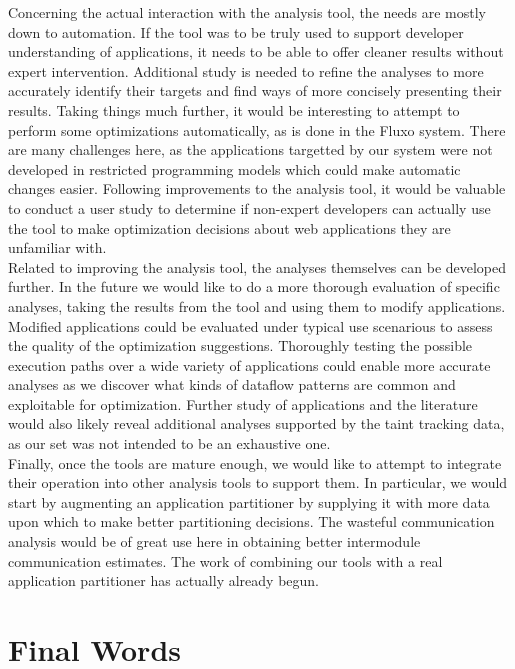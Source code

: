 \documentclass[msc,oneside]{ubcthesis}
\begin{document}
Concerning the actual interaction with the analysis tool, the needs are mostly down to automation. If the tool was to be truly used to support developer understanding of applications, it needs to be able to offer cleaner results without expert intervention. Additional study is needed to refine the analyses to more accurately identify their targets and find ways of more concisely presenting their results. Taking things much further, it would be interesting to attempt to perform some optimizations automatically, as is done in the Fluxo system. There are many challenges here, as the applications targetted by our system were not developed in restricted programming models which could make automatic changes easier. Following improvements to the analysis tool, it would be valuable to conduct a user study to determine if non-expert developers can actually use the tool to make optimization decisions about web applications they are unfamiliar with.\\

Related to improving the analysis tool, the analyses themselves can be developed further. In the future we would like to do a more thorough evaluation of specific analyses, taking the results from the tool and using them to modify applications. Modified applications could be evaluated under typical use scenarious to assess the quality of the optimization suggestions. Thoroughly testing the possible execution paths over a wide variety of applications could enable more accurate analyses as we discover what kinds of dataflow patterns are common and exploitable for optimization. Further study of applications and the literature would also likely reveal additional analyses supported by the taint tracking data, as our set was not intended to be an exhaustive one.\\

Finally, once the tools are mature enough, we would like to attempt to integrate their operation into other analysis tools to support them. In particular, we would start by augmenting an application partitioner by supplying it with more data upon which to make better partitioning decisions. The wasteful communication analysis would be of great use here in obtaining better intermodule communication estimates. The work of combining our tools with a real application partitioner has actually already begun.

\section{Final Words}
\end{document}
